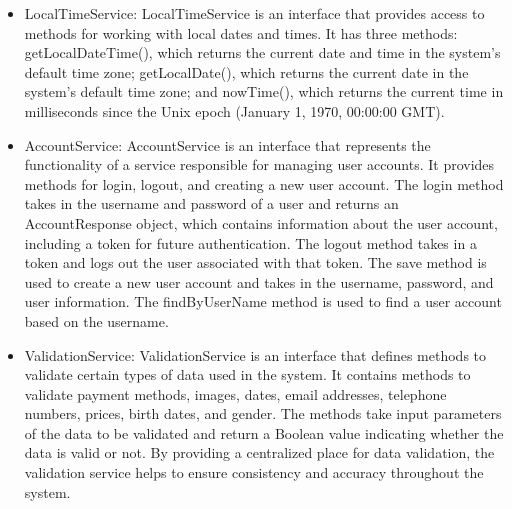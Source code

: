 \begin{itemize}
\item LocalTimeService: LocalTimeService is an interface that provides access to methods for working with local dates and times. It has three methods: getLocalDateTime(), which returns the current date and time in the system's default time zone; getLocalDate(), which returns the current date in the system's default time zone; and nowTime(), which returns the current time in milliseconds since the Unix epoch (January 1, 1970, 00:00:00 GMT).

\item AccountService: AccountService is an interface that represents the functionality of a service responsible for managing user accounts. It provides methods for login, logout, and creating a new user account. The login method takes in the username and password of a user and returns an AccountResponse object, which contains information about the user account, including a token for future authentication. The logout method takes in a token and logs out the user associated with that token. The save method is used to create a new user account and takes in the username, password, and user information. The findByUserName method is used to find a user account based on the username.

\item ValidationService: ValidationService is an interface that defines methods to validate certain types of data used in the system. It contains methods to validate payment methods, images, dates, email addresses, telephone numbers, prices, birth dates, and gender. The methods take input parameters of the data to be validated and return a Boolean value indicating whether the data is valid or not. By providing a centralized place for data validation, the validation service helps to ensure consistency and accuracy throughout the system.

\end{itemize}
